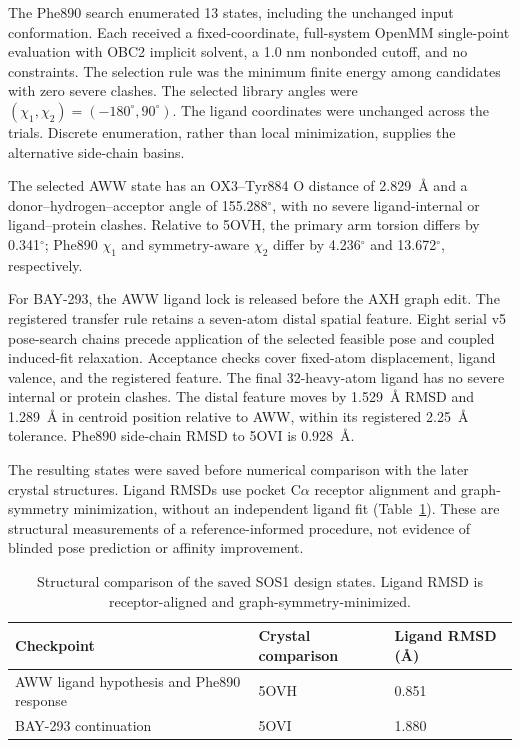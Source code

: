 \documentclass[11pt]{article}
\begin{document}
\begin{small}
The Phe890 search enumerated 13 states, including the unchanged input conformation. Each received a fixed-coordinate, full-system OpenMM single-point evaluation with OBC2 implicit solvent, a 1.0 nm nonbonded cutoff, and no constraints. The selection rule was the minimum finite energy among candidates with zero severe clashes. The selected library angles were $(\chi_1,\chi_2)=(-180^{\circ},90^{\circ})$. The ligand coordinates were unchanged across the trials. Discrete enumeration, rather than local minimization, supplies the alternative side-chain basins.

The selected AWW state has an OX3--Tyr884 O distance of 2.829~\AA{} and a donor--hydrogen--acceptor angle of 155.288$^{\circ}$, with no severe ligand-internal or ligand--protein clashes. Relative to 5OVH, the primary arm torsion differs by 0.341$^{\circ}$; Phe890 $\chi_1$ and symmetry-aware $\chi_2$ differ by 4.236$^{\circ}$ and 13.672$^{\circ}$, respectively.

For BAY-293, the AWW ligand lock is released before the AXH graph edit. The registered transfer rule retains a seven-atom distal spatial feature. Eight serial v5 pose-search chains precede application of the selected feasible pose and coupled induced-fit relaxation. Acceptance checks cover fixed-atom displacement, ligand valence, and the registered feature. The final 32-heavy-atom ligand has no severe internal or protein clashes. The distal feature moves by 1.529~\AA{} RMSD and 1.289~\AA{} in centroid position relative to AWW, within its registered 2.25~\AA{} tolerance. Phe890 side-chain RMSD to 5OVI is 0.928~\AA{}.

The resulting states were saved before numerical comparison with the later crystal structures. Ligand RMSDs use pocket C$\alpha$ receptor alignment and graph-symmetry minimization, without an independent ligand fit (Table~\ref{tab:appA_sos1_eval}). These are structural measurements of a reference-informed procedure, not evidence of blinded pose prediction or affinity improvement.

\begin{table}[htbp]
\centering\small
\caption{Structural comparison of the saved SOS1 design states. Ligand RMSD is receptor-aligned and graph-symmetry-minimized.}
\label{tab:appA_sos1_eval}
\begin{tabular}{@{}lll@{}}
\toprule
\textbf{Checkpoint} & \textbf{Crystal comparison} & \textbf{Ligand RMSD (\AA{})}\\
\midrule
AWW ligand hypothesis and Phe890 response & 5OVH & 0.851\\
BAY-293 continuation & 5OVI & 1.880\\
\bottomrule
\end{tabular}
\end{table}


\end{small}
\end{document}
